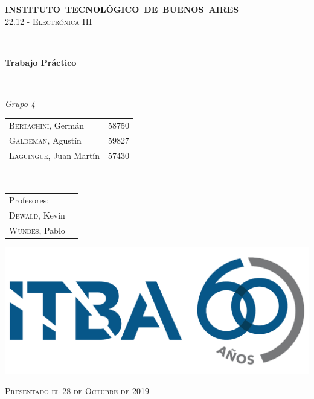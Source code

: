 \begin{titlepage}
    \newcommand{\HRule}{\rule{\linewidth}{0.5mm}}
    \begin{center}
	    \mbox{\textsc{\large \bfseries {INSTITUTO TECNOL\'OGICO DE BUENOS AIRES}}} \\[1cm]
	    \textsc{\Large 22.12 - Electr\'onica III} \\[0.5cm]    
	    \HRule \\[0.6cm]
	    { 	\Huge \bfseries Trabajo Pr\'actico 	} \\[0.4cm] 
	    \HRule \\[1.5cm]
	    \large
	    \emph{\Large Grupo 4}\\
	    \vspace{10px}
	   
	    \begin{tabular}{lr}
	    \textsc{Bertachini}, Germ\'an  & 58750 \\ 	
	    \textsc{Galdeman}, Agust\'in  & 59827 \\
	    \textsc{Laguingue}, Juan Mart\'in  & 57430 \\
	    \end{tabular} \\
	    \vspace{20px}
	    \begin{tabular}{lr}
	    \textsc{}Profesores:\\
	    \textsc{Dewald}, Kevin\\
	    \textsc{Wundes}, Pablo\\
	    \end{tabular}
	    \vspace{60px}
	
		\includegraphics[scale=0.20]{Extras/ITBA.png}    
		\vspace{30px}
	    
	    \textsc{\large Presentado el 28 de Octubre de 2019}\\
    \end{center}
\end{titlepage}
